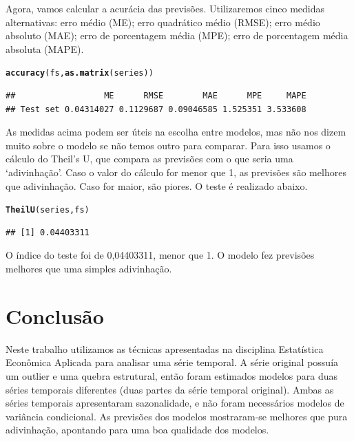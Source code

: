 \documentclass{article}\usepackage[]{graphicx}\usepackage[]{color}
\makeatletter
\newcommand{\hlstd}[1]{\textcolor[rgb]{0.345,0.345,0.345}{#1}}%
\newcommand{\hlkwd}[1]{\textcolor[rgb]{0.737,0.353,0.396}{\textbf{#1}}}%
\newenvironment{kframe}{%
 \def\at@end@of@kframe{}%
 \ifinner\ifhmode%
  \def\at@end@of@kframe{\end{minipage}}%
  \begin{minipage}{\columnwidth}%
 \fi\fi%
 \def\FrameCommand##1{\hskip\@totalleftmargin \hskip-\fboxsep
 \colorbox{shadecolor}{##1}\hskip-\fboxsep
     \hskip-\linewidth \hskip-\@totalleftmargin \hskip\columnwidth}%
 \MakeFramed {\advance\hsize-\width
   \@totalleftmargin\z@ \linewidth\hsize
   \@setminipage}}%
 {\par\unskip\endMakeFramed%
 \at@end@of@kframe}
\newenvironment{knitrout}{}{} %
\makeatother
\begin{document}
            Agora, vamos calcular a acurácia das previsões. Utilizaremos cinco medidas alternativas: erro médio (ME); erro quadrático médio (RMSE); erro médio absoluto (MAE); erro de porcentagem média (MPE); erro de porcentagem média absoluta (MAPE).
            
\begin{knitrout}
\color{fgcolor}\begin{kframe}
\begin{alltt}
\hlkwd{accuracy}\hlstd{(fs,}\hlkwd{as.matrix}\hlstd{(series))}
\end{alltt}
\begin{verbatim}
##                  ME      RMSE        MAE      MPE     MAPE
## Test set 0.04314027 0.1129687 0.09046585 1.525351 3.533608
\end{verbatim}
\end{kframe}
\end{knitrout}

            As medidas acima podem ser úteis na escolha entre modelos, mas não nos dizem muito sobre o modelo se não temos outro para comparar. Para isso usamos o cálculo do Theil's U, que compara as previsões com o que seria uma `adivinhação'. Caso o valor do cálculo for menor que 1, as previsões são melhores que adivinhação. Caso for maior, são piores. O teste é realizado abaixo.
            
\begin{knitrout}
\color{fgcolor}\begin{kframe}
\begin{alltt}
\hlkwd{TheilU}\hlstd{(series,fs)}
\end{alltt}
\begin{verbatim}
## [1] 0.04403311
\end{verbatim}
\end{kframe}
\end{knitrout}
            
            O índice do teste foi de 0,04403311, menor que 1. O modelo fez previsões melhores que uma simples adivinhação.
            
            
            
            
        
        



\section{Conclusão}

    Neste trabalho utilizamos as técnicas apresentadas na disciplina Estatística Econômica Aplicada para analisar uma série temporal. A série original possuía um outlier e uma quebra estrutural, então foram estimados modelos para duas séries temporais diferentes (duas partes da série temporal original). Ambas as séries temporais apresentaram sazonalidade, e não foram necessários modelos de variância condicional. As previsões dos modelos mostraram-se melhores que pura adivinhação, apontando para uma boa qualidade dos modelos.

\printbibliography[heading=bibintoc]
\end{document}
